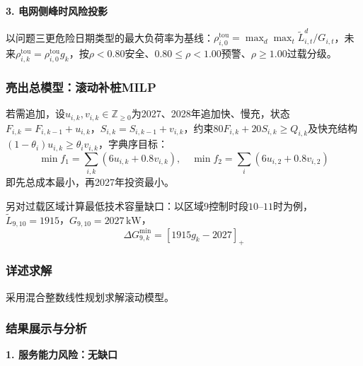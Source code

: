 \documentclass[a4paper,12pt]{ctexart}
\begin{document}
\textbf{3. 电网侧峰时风险投影}

以问题三更危险日期类型的最大负荷率为基线：$\rho_{i,0}^{\mathrm{tou}}=\max_{d}\max_{t}\widetilde{L}_{i,t}^{d}/G_{i,t}$，未来$\rho_{i,k}^{\mathrm{tou}}=\rho_{i,0}^{\mathrm{tou}}g_{k}$，按$\rho<0.80$安全、$0.80\le\rho<1.00$预警、$\rho\ge1.00$过载分级。

\subsubsection{亮出总模型：滚动补桩MILP}

若需追加，设$u_{i,k},v_{i,k}\in\mathbb{Z}_{\ge0}$为2027、2028年追加快、慢充，状态$F_{i,k}=F_{i,k-1}+u_{i,k}$，$S_{i,k}=S_{i,k-1}+v_{i,k}$，约束$80F_{i,k}+20S_{i,k}\ge Q_{i,k}$及快充结构$(1-\theta_{i})u_{i,k}\ge\theta_{i}v_{i,k}$，字典序目标：
\begin{equation}
\min f_{1}=\sum_{i,k}(6u_{i,k}+0.8v_{i,k}),\quad \min f_{2}=\sum_{i}(6u_{i,2}+0.8v_{i,2})\tag{4-1}
\end{equation}
即先总成本最小，再2027年投资最小。

另对过载区域计算最低技术容量缺口：以区域$9$控制时段$10\text{--}11$时为例，$\widetilde{L}_{9,10}=1915$，$G_{9,10}=2027\,\mathrm{kW}$，
\begin{equation}
\Delta G_{9,k}^{\min}=[1915g_{k}-2027]_{+}\tag{4-2}
\end{equation}

\subsubsection{详述求解}
采用混合整数线性规划求解滚动模型。

\subsubsection{结果展示与分析}

\textbf{1. 服务能力风险：无缺口}
\end{document}
